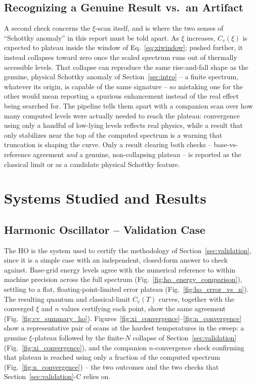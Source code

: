 \documentclass[10pt,conference]{IEEEtran}
\begin{document}
\subsection{Recognizing a Genuine Result vs.\ an Artifact}
A second check concerns the $\xi$-scan itself, and is where the two senses of ``Schottky anomaly'' in this report must be told apart. As $\xi$ increases, $C_v(\xi)$ is expected to plateau inside the window of Eq.~\eqref{eq:xiwindow}; pushed further, it instead collapses toward zero once the scaled spectrum runs out of thermally accessible levels. That collapse can reproduce the same rise-and-fall shape as the genuine, physical Schottky anomaly of Section~\ref{sec:intro} -- a finite spectrum, whatever its origin, is capable of the same signature -- so mistaking one for the other would mean reporting a spurious enhancement instead of the real effect being searched for. The pipeline tells them apart with a companion scan over how many computed levels were actually needed to reach the plateau: convergence using only a handful of low-lying levels reflects real physics, while a result that only stabilizes near the top of the computed spectrum is a warning that truncation is shaping the curve. Only a result clearing both checks -- base-vs-reference agreement \emph{and} a genuine, non-collapsing plateau -- is reported as the classical limit or as a candidate physical Schottky feature.

\section{Systems Studied and Results}
\label{sec:systems}

\subsection{Harmonic Oscillator -- Validation Case}
The HO is the system used to certify the methodology of Section~\ref{sec:validation}, since it is a simple case with an independent, closed-form answer to check against. Base-grid energy levels agree with the numerical reference to within machine precision across the full spectrum (Fig.~\ref{fig:ho_energy_comparison}), settling to a flat, floating-point-limited error plateau (Fig.~\ref{fig:ho_error_vs_n}). The resulting quantum and classical-limit $C_v(T)$ curves, together with the converged $\xi$ and $n$ values certifying each point, show the same agreement (Fig.~\ref{fig:cv_summary_ho}). Figures~\ref{fig:xi_convergence}--\ref{fig:n_convergence} show a representative pair of scans at the hardest temperatures in the sweep: a genuine $\xi$-plateau followed by the finite-$N$ collapse of Section~\ref{sec:validation} (Fig.~\ref{fig:xi_convergence}), and the companion $n$-convergence check confirming that plateau is reached using only a fraction of the computed spectrum (Fig.~\ref{fig:n_convergence}) -- the two outcomes and the two checks that Section~\ref{sec:validation}-C relies on.
\end{document}
